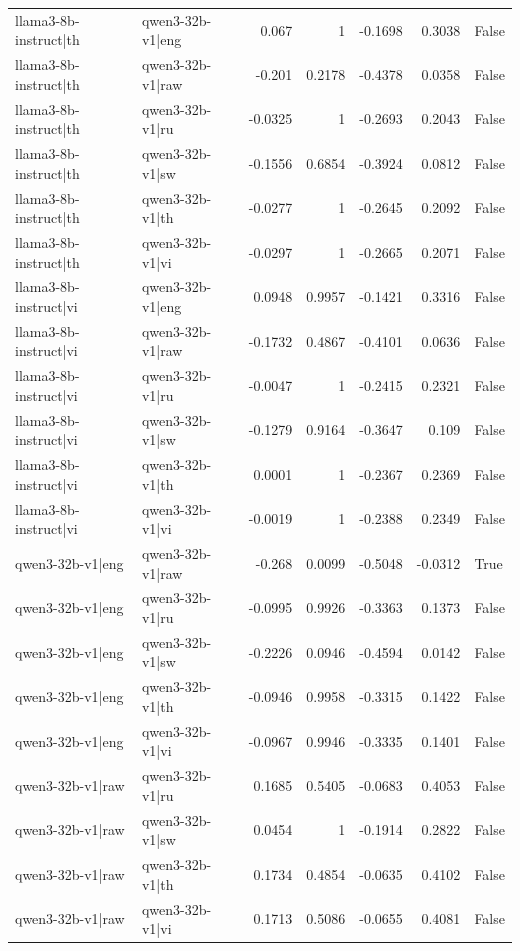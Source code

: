 \begin{table}
\begin{tabular}{l l r r r r l}
llama3-8b-instruct|th & qwen3-32b-v1|eng & 0.067 & 1 & -0.1698 & 0.3038 & False \\
llama3-8b-instruct|th & qwen3-32b-v1|raw & -0.201 & 0.2178 & -0.4378 & 0.0358 & False \\
llama3-8b-instruct|th & qwen3-32b-v1|ru & -0.0325 & 1 & -0.2693 & 0.2043 & False \\
llama3-8b-instruct|th & qwen3-32b-v1|sw & -0.1556 & 0.6854 & -0.3924 & 0.0812 & False \\
llama3-8b-instruct|th & qwen3-32b-v1|th & -0.0277 & 1 & -0.2645 & 0.2092 & False \\
llama3-8b-instruct|th & qwen3-32b-v1|vi & -0.0297 & 1 & -0.2665 & 0.2071 & False \\
llama3-8b-instruct|vi & qwen3-32b-v1|eng & 0.0948 & 0.9957 & -0.1421 & 0.3316 & False \\
llama3-8b-instruct|vi & qwen3-32b-v1|raw & -0.1732 & 0.4867 & -0.4101 & 0.0636 & False \\
llama3-8b-instruct|vi & qwen3-32b-v1|ru & -0.0047 & 1 & -0.2415 & 0.2321 & False \\
llama3-8b-instruct|vi & qwen3-32b-v1|sw & -0.1279 & 0.9164 & -0.3647 & 0.109 & False \\
llama3-8b-instruct|vi & qwen3-32b-v1|th & 0.0001 & 1 & -0.2367 & 0.2369 & False \\
llama3-8b-instruct|vi & qwen3-32b-v1|vi & -0.0019 & 1 & -0.2388 & 0.2349 & False \\
qwen3-32b-v1|eng & qwen3-32b-v1|raw & -0.268 & 0.0099 & -0.5048 & -0.0312 & True \\
qwen3-32b-v1|eng & qwen3-32b-v1|ru & -0.0995 & 0.9926 & -0.3363 & 0.1373 & False \\
qwen3-32b-v1|eng & qwen3-32b-v1|sw & -0.2226 & 0.0946 & -0.4594 & 0.0142 & False \\
qwen3-32b-v1|eng & qwen3-32b-v1|th & -0.0946 & 0.9958 & -0.3315 & 0.1422 & False \\
qwen3-32b-v1|eng & qwen3-32b-v1|vi & -0.0967 & 0.9946 & -0.3335 & 0.1401 & False \\
qwen3-32b-v1|raw & qwen3-32b-v1|ru & 0.1685 & 0.5405 & -0.0683 & 0.4053 & False \\
qwen3-32b-v1|raw & qwen3-32b-v1|sw & 0.0454 & 1 & -0.1914 & 0.2822 & False \\
qwen3-32b-v1|raw & qwen3-32b-v1|th & 0.1734 & 0.4854 & -0.0635 & 0.4102 & False \\
qwen3-32b-v1|raw & qwen3-32b-v1|vi & 0.1713 & 0.5086 & -0.0655 & 0.4081 & False \\

\end{tabular}
\end{table}
